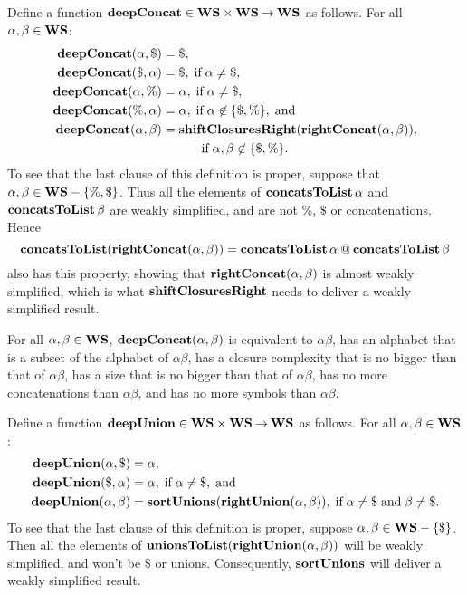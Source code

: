 Define a function $\mathbf{deepConcat}\in\mathbf{WS}\times\mathbf{WS}\mathbin{\to}\mathbf{WS}$ as follows.  For all
$\alpha,\beta\in\mathbf{WS}$:
\begin{align*}
  \mathbf{deepConcat}(\alpha, \$) &= \$ , \\
  \mathbf{deepConcat}(\$, \alpha) &= \$ , \;\allowbreak\mbox{if}\allowbreak\; \alpha\neq\$ , \\
  \mathbf{deepConcat}(\alpha, \%) &= \alpha, \;\allowbreak\mbox{if}\allowbreak\; \alpha\neq\$ , \\
  \mathbf{deepConcat}(\%, \alpha) &= \alpha, \;\allowbreak\mbox{if}\allowbreak\; \alpha\not\in\{\$,\%\} ,
  \;\allowbreak\mbox{and}\allowbreak\; \\
  \mathbf{deepConcat}(\alpha,\beta) &=
    \mathbf{shiftClosuresRight}(\mathbf{rightConcat}(\alpha, \beta)), \\
    &{} \hspace*{1cm}\;\allowbreak\mbox{if}\allowbreak\;\alpha,\beta\not\in\{\$,\%\} .
\end{align*}
To see that the last clause of this definition is proper, suppose
that $\alpha,\beta\in\mathbf{WS}-\{\%,\$\}$.  Thus all the elements of
$\mathbf{concatsToList}\,\alpha$ and $\mathbf{concatsToList}\,\beta$ are weakly
simplified, and are not $\%$, $\$$ or concatenations.  Hence
\begin{displaymath}
\mathbf{concatsToList}(\mathbf{rightConcat}(\alpha,\beta)) =  
\mathbf{concatsToList}\,\alpha \mathbin{@} \mathbf{concatsToList}\,\beta
\end{displaymath}
also has this property, showing that $\mathbf{rightConcat}(\alpha,\beta)$
is almost weakly simplified, which is what $\mathbf{shiftClosuresRight}$
needs to deliver a weakly simplified result.

\begin{lemma}
\label{DeepConcatLem}
For all $\alpha,\beta\in\mathbf{WS}$, $\mathbf{deepConcat}(\alpha,\beta)$
is equivalent to $\alpha\beta$, has an alphabet that is a
subset of the alphabet of $\alpha\beta$, has a closure complexity that
is no bigger than that of $\alpha\beta$, has a size that is no bigger
than that of $\alpha\beta$, has no more concatenations than
$\alpha\beta$, and has no more symbols than $\alpha\beta$.
\end{lemma}

Define a function $\mathbf{deepUnion}\in\mathbf{WS}\times\mathbf{WS}\mathbin{\to}\mathbf{WS}$ as follows.  For all
$\alpha,\beta\in\mathbf{WS}$:
\begin{align*}
  \mathbf{deepUnion}(\alpha, \$) &= \alpha , \\
  \mathbf{deepUnion}(\$, \alpha) &= \alpha , \;\allowbreak\mbox{if}\allowbreak\; \alpha\neq\$ , \;\allowbreak\mbox{and}\allowbreak\; \\
  \mathbf{deepUnion}(\alpha, \beta) &=
    \mathbf{sortUnions}(\mathbf{rightUnion}(\alpha, \beta)), \;\allowbreak\mbox{if}\allowbreak\; \alpha\neq\$
    \;\allowbreak\mbox{and}\allowbreak\; \beta\neq\$ .
\end{align*}
To see that the last clause of this definition is proper, suppose
$\alpha,\beta\in\mathbf{WS}-\{\$\}$.  Then all the elements of
$\mathbf{unionsToList}(\mathbf{rightUnion}(\alpha,\beta))$ will be weakly simplified,
and won't be $\$$ or unions.  Consequently, $\mathbf{sortUnions}$ will
deliver a weakly simplified result.

